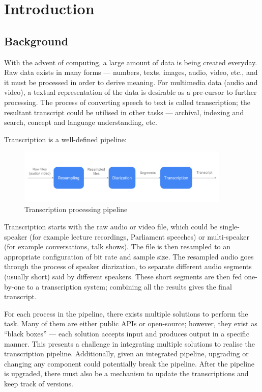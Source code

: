 \chapter{Introduction}

\section{Background}

With the advent of computing, a large amount of data is being created everyday.
Raw data exists in many forms --- numbers, texts, images, audio, video, etc.,
and it must be processed in order to derive meaning. For multimedia data (audio
and video), a textual representation of the data is desirable as a pre-cursor
to further processing. The process of converting speech to text is called
transcription; the resultant transcript could be utilised in other tasks ---
archival, indexing and search, concept and language understanding, etc.

Transcription is a well-defined pipeline:

\begin{figure}[h]
\begin{center}
    \includegraphics[width=0.9\textwidth]{../images/pipeline.png}
    \caption{Transcription processing pipeline}
\end{center}
\end{figure}

Transcription starts with the raw audio or video file, which could be
single-speaker (for example lecture recordings, Parliament speeches) or
multi-speaker (for example conversations, talk shows). The file is then resampled
to an appropriate configuration of bit rate and sample size. The resampled audio
goes through the process of speaker diarization, to separate different audio
segments (usually short) said by different speakers. These short segments are
then fed one-by-one to a transcription system; combining all the results gives
the final transcript.

For each process in the pipeline, there exists multiple solutions to perform
the task. Many of them are either public APIs or open-source; however, they exist
as ``black boxes'' --- each solution accepts input and produces output in a
specific manner. This presents a challenge in integrating multiple solutions to
realise the transcription pipeline. Additionally, given an integrated pipeline,
upgrading or changing any component could potentially break the pipeline. After
the pipeline is upgraded, there must also be a mechanism to update the
transcriptions and keep track of versions. 

